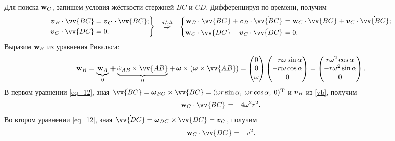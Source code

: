 Для поиска $\mbox{\boldmath $\mathrm{w}$}_C$, запишем условия жёсткости стержней $BC$ и $CD$. Дифференцируя по времени, получим
\begin{equation}
\label{eq_12}
        \left.\begin{aligned}
            \vc{v}_B \cdot \vv{BC} &= \vc{v}_C \cdot \vv{BC}; \\
             \vc{v}_C \cdot \vv{DC} &= 0.
        \end{aligned}\right\}
    \hspace{0.25cm} \overset{d / dt}{\Rightarrow}  \hspace{0.25cm} 
        \left\{\begin{aligned}
        \vc{\mathrm{w}}_B \cdot \vv{BC} + \vc{v}_B \cdot \dot{\vv{BC}} &=
        \vc{\mathrm{w}}_C \cdot \vv{BC} + \vc{v}_C \cdot \dot{\vv{BC}}; \\
        \vc{\mathrm{w}}_C \cdot \vv{DC} + \vc{v}_C \cdot \dot{\vv{DC}} &= 0.
        \end{aligned}\right.
\end{equation}
Выразим $\mbox{\boldmath $\mathrm{w}$}_B$ из уравнения Ривальса:
$$
    \vc{\mathrm{w}}_B = \underbrace{\vc{\mathrm{w}}_A}_{0} + \underbrace{\dot{\omega}_{AB} \times \vv{AB}}_{0} +
    \,
     \vc{\omega} \times \left(
        \vc{\omega} \times \vv{AB}
    \right) = \begin{pmatrix}
        0 \\ 0 \\ \omega
    \end{pmatrix} 
    \begin{pmatrix}
        -r\omega\sin\alpha \\
        -r\omega\cos\alpha \\
        0
    \end{pmatrix} = \begin{pmatrix}
        r\omega^2 \cos \alpha \\
        -r\omega^2 \sin \alpha \\
        0
    \end{pmatrix}.
$$
В первом уравнении \eqref{eq_12}, зная $\dot{\vv{BC}} = \vc{\omega}_{BC} \times \vv{BC} = (\omega r \sin \alpha,\; \omega r \cos \alpha,\; 0)\T$ и $\mbox{\boldmath $v$}_B$ из \eqref{vb}, получим
\begin{equation}
    \label{eqI}
    \vc{\mathrm{w}}_C \cdot \vv{BC} = - 4 \omega^2 r^2.
\end{equation}
Во втором уравнении \eqref{eq_12}, зная $\dot{\vv{DC}} = \vc{\omega}_{DC} \times \vv{DC} = \vc{v}_C$, получим
\begin{equation}
    \label{eq2}
    \vc{\mathrm{w}}_C \cdot \vv{DC} = -v^2.
\end{equation}
